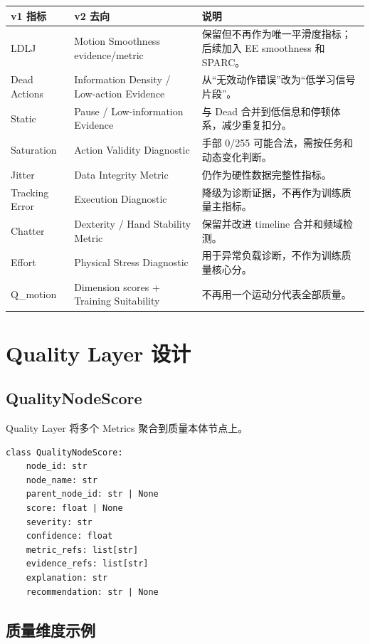 \documentclass[UTF8,zihao=-4,oneside,openany]{ctexrep}
\begin{document}
\begin{longtable}{L{3.4cm} L{4.4cm} L{5.8cm}}
\toprule
v1 指标 & v2 去向 & 说明 \\
\midrule
LDLJ & Motion Smoothness evidence/metric & 保留但不再作为唯一平滑度指标；后续加入 EE smoothness 和 SPARC。 \\
Dead Actions & Information Density / Low-action Evidence & 从“无效动作错误”改为“低学习信号片段”。 \\
Static & Pause / Low-information Evidence & 与 Dead 合并到低信息和停顿体系，减少重复扣分。 \\
Saturation & Action Validity Diagnostic & 手部 0/255 可能合法，需按任务和动态变化判断。 \\
Jitter & Data Integrity Metric & 仍作为硬性数据完整性指标。 \\
Tracking Error & Execution Diagnostic & 降级为诊断证据，不再作为训练质量主指标。 \\
Chatter & Dexterity / Hand Stability Metric & 保留并改进 timeline 合并和频域检测。 \\
Effort & Physical Stress Diagnostic & 用于异常负载诊断，不作为训练质量核心分。 \\
Q\_motion & Dimension scores + Training Suitability & 不再用一个运动分代表全部质量。 \\
\bottomrule
\end{longtable}

\section{Quality Layer 设计}

\subsection{QualityNodeScore}

Quality Layer 将多个 Metrics 聚合到质量本体节点上。

\begin{verbatim}
class QualityNodeScore:
    node_id: str
    node_name: str
    parent_node_id: str | None
    score: float | None
    severity: str
    confidence: float
    metric_refs: list[str]
    evidence_refs: list[str]
    explanation: str
    recommendation: str | None
\end{verbatim}

\subsection{质量维度示例}
\end{document}
